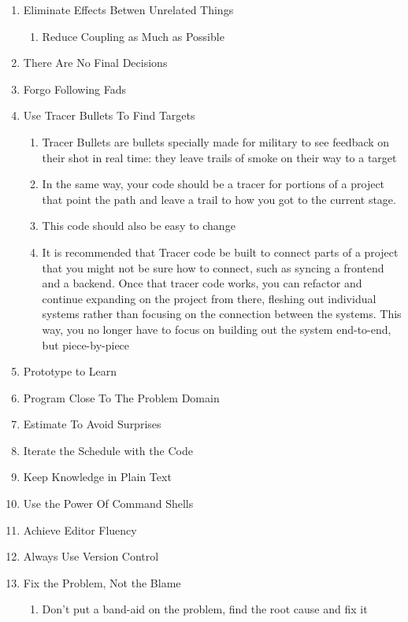 \documentclass{article}
\begin{document}
\begin{enumerate}
    \item Eliminate Effects Betwen Unrelated Things
        \begin{enumerate}
            \item Reduce Coupling as Much as Possible
        \end{enumerate}
    \item There Are No Final Decisions
    \item Forgo Following Fads
    \item Use Tracer Bullets To Find Targets
        \begin{enumerate}
            \item Tracer Bullets are bullets specially made for military to see feedback on their shot in real time: they leave trails of smoke on their way to a target
            \item In the same way, your code should be a tracer for portions of a project that point the path and leave a trail to how you got to the current stage.
            \item This code should also be easy to change
            \item It is recommended that Tracer code be built to connect parts of a project that you might not be sure how to connect, such as syncing a frontend and a backend. Once that tracer code works, you can refactor and continue expanding on the project from there, fleshing out individual systems rather than focusing on the connection between the systems. This way, you no longer have to focus on building out the system end-to-end, but piece-by-piece
        \end{enumerate}
    \item Prototype to Learn
    \item Program Close To The Problem Domain
    \item Estimate To Avoid Surprises
    \item Iterate the Schedule with the Code
    \item Keep Knowledge in Plain Text
    \item Use the Power Of Command Shells
    \item Achieve Editor Fluency
    \item Always Use Version Control
    \item Fix the Problem, Not the Blame
        \begin{enumerate}
            \item Don't put a band-aid on the problem, find the root cause and fix it
        \end{enumerate}

\end{enumerate}
\end{document}
